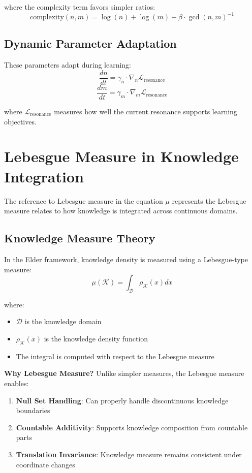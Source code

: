 where the complexity term favors simpler ratios:
\begin{equation}
\text{complexity}(n,m) = \log(n) + \log(m) + \beta \cdot \gcd(n,m)^{-1}
\end{equation}

\subsection{Dynamic Parameter Adaptation}

These parameters adapt during learning:
\begin{equation}
\frac{dn}{dt} = \gamma_n \cdot \nabla_n \mathcal{L}_{\text{resonance}}
\end{equation}
\begin{equation}
\frac{dm}{dt} = \gamma_m \cdot \nabla_m \mathcal{L}_{\text{resonance}}
\end{equation}

where $\mathcal{L}_{\text{resonance}}$ measures how well the current resonance supports learning objectives.

\section{Lebesgue Measure in Knowledge Integration}

The reference to Lebesgue measure in the equation $\mu$ represents the Lebesgue measure relates to how knowledge is integrated across continuous domains.

\subsection{Knowledge Measure Theory}

In the Elder framework, knowledge density is measured using a Lebesgue-type measure:
\begin{equation}
\mu(\mathcal{K}) = \int_{\mathcal{D}} \rho_{\mathcal{K}}(x) dx
\end{equation}

where:
\begin{itemize}
    \item $\mathcal{D}$ is the knowledge domain
    \item $\rho_{\mathcal{K}}(x)$ is the knowledge density function
    \item The integral is computed with respect to the Lebesgue measure
\end{itemize}

\textbf{Why Lebesgue Measure?}
Unlike simpler measures, the Lebesgue measure enables:
\begin{enumerate}
    \item \textbf{Null Set Handling}: Can properly handle discontinuous knowledge boundaries
    \item \textbf{Countable Additivity}: Supports knowledge composition from countable parts
    \item \textbf{Translation Invariance}: Knowledge measure remains consistent under coordinate changes
\end{enumerate}

